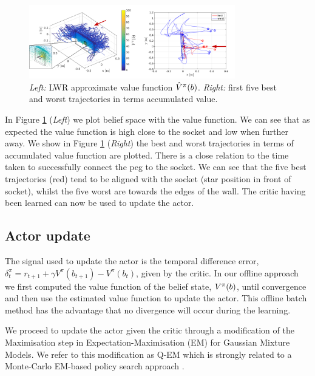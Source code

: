\begin{figure}
 \centering
 \setlength\fboxsep{0pt}
  \setlength\fboxrule{0.25pt}
  \includegraphics[width=0.8\textwidth]{./ch4-PiH/Figures/Figure1.pdf}
 \caption{\textit{Left:} LWR approximate value function $\hat{V}^{\pi}(b)$. \textit{Right:} first five best and worst trajectories in terms accumulated value.}
  \label{fig:Figure1}
\end{figure}

In Figure \ref{fig:Figure1} (\textit{Left}) we plot belief space with the value function. We can see that as expected the 
value function is high close to the socket and low when further away. We show in Figure \ref{fig:Figure1}
(\textit{Right}) the best and worst trajectories in terms of accumulated value function are plotted. There is a
close relation to the time taken to successfully connect the peg to the socket. We can see that the five best trajectories
(red) tend to be aligned with the socket (star position in front of socket), whilst the five worst are towards the edges
of the wall. The critic having been learned can now be used to update the actor.

\subsection{Actor update}

The signal used to update the actor is the temporal difference error, 
$\delta^{\pi}_t = r_{t+1} + \gamma V^{\pi}(b_{t+1}) - V^{\pi}(b_t)$, given by the critic\cite[Chap. 6]{sutton1998reinforcement}. 
In our offline approach we first computed the value function of the belief state, $V^{\pi}(b)$, 
until convergence and then use the estimated value function to update the actor. This offline batch 
method has the advantage that no divergence will occur during the learning.

We proceed to update the actor given the critic through a modification of the Maximisation step in  Expectation-Maximisation (EM) 
for Gaussian Mixture Models. We refer to this modification as Q-EM which is strongly related to a Monte-Carlo EM-based policy 
search approach \cite[p.50]{DeisenrothNP2013}. 

